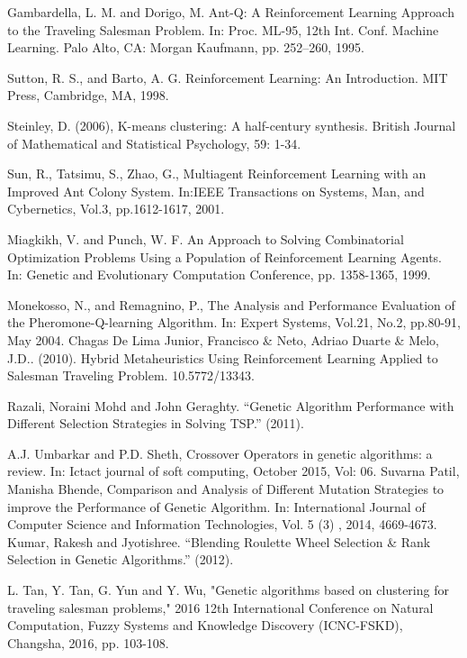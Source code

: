 \documentclass[10pt]{article}
\begin{document}
\begin{thebibliography}{9}
Gambardella, L. M. and Dorigo, M. Ant-Q: A Reinforcement Learning Approach to the Traveling Salesman Problem. In: Proc. ML-95, 12th Int. Conf. Machine Learning. Palo Alto, CA: Morgan Kaufmann, pp. 252–260, 1995.

Sutton,  R.  S.,  and  Barto,  A.  G. Reinforcement  Learning:  An  Introduction.  MIT  Press, Cambridge, MA, 1998.

Steinley, D. (2006), K-means clustering: A half-century synthesis. British Journal of Mathematical and Statistical Psychology, 59: 1-34.

Sun,  R.,  Tatsimu,  S.,  Zhao,  G.,  Multiagent  Reinforcement  Learning  with  an  Improved Ant  Colony  System.  In:IEEE  Transactions  on  Systems,  Man,  and  Cybernetics,  Vol.3, pp.1612-1617, 2001.

 Miagkikh,  V.  and  Punch,  W.  F.  An  Approach  to  Solving  Combinatorial  Optimization Problems   Using   a   Population   of   Reinforcement   Learning   Agents.   In: Genetic   and Evolutionary Computation Conference, pp. 1358-1365, 1999. 

 Monekosso,  N.,  and  Remagnino,  P.,  The  Analysis  and  Performance  Evaluation  of  the Pheromone-Q-learning Algorithm. In: Expert Systems, Vol.21, No.2, pp.80-91, May 2004. 
Chagas De Lima Junior, Francisco \& Neto, Adriao Duarte \& Melo, J.D.. (2010). Hybrid Metaheuristics Using Reinforcement Learning Applied to Salesman Traveling Problem. 10.5772/13343.


Razali, Noraini Mohd and John Geraghty. “Genetic Algorithm Performance with Different Selection Strategies in Solving TSP.” (2011).

A.J. Umbarkar and P.D. Sheth, Crossover Operators in genetic algorithms: a review. In: Ictact journal of soft computing, October 2015, Vol: 06.
Suvarna Patil, Manisha Bhende, Comparison and Analysis of Different Mutation Strategies to improve the Performance of Genetic Algorithm. In:  International Journal of Computer Science and Information Technologies, Vol. 5 (3) , 2014, 4669-4673.
Kumar, Rakesh and Jyotishree. “Blending Roulette Wheel Selection \& Rank Selection in Genetic Algorithms.” (2012).


L. Tan, Y. Tan, G. Yun and Y. Wu, "Genetic algorithms based on clustering for traveling salesman problems," 2016 12th International Conference on Natural Computation, Fuzzy Systems and Knowledge Discovery (ICNC-FSKD), Changsha, 2016, pp. 103-108.


\end{thebibliography}
\end{document}
